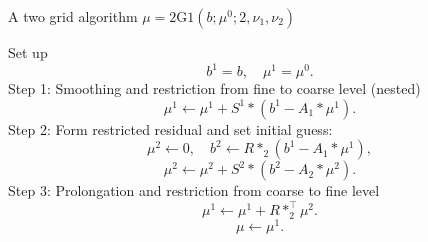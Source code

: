 \begin{breakablealgorithm}%
	\caption{A two grid algorithm $\mu = {\text{2G1}}(b; \mu^0; 2,\nu_1, \nu_2)$}
\label{alg:L-Slash11d}
\begin{algorithmic}
	\State Set up
		$$
		b^1 = b, \quad \mu^{1}=\mu^0. 
		$$
		\State Step 1: Smoothing and restriction from fine to coarse level (nested)
		\State
		\begin{equation}\label{eq:smoothing}
		\mu^{1} \leftarrow \mu^{1} + S^1 \ast (b^1 - A_1 \ast \mu^1).
		\end{equation}
		\EndFor
		\State Step 2: Form restricted residual and set initial guess:
		$$
		\mu^{2} \leftarrow 0, \quad b^{2} \leftarrow R \ast_2
                (b^1-  A_1\ast \mu^{1}), 
		$$
		\State
		\begin{equation}\label{eq:smoothing}
		\mu^2 \leftarrow \mu^2+ S^2 \ast (b^2- A_2\ast \mu^2).
		\end{equation}
		\EndFor
		\State Step 3: Prolongation and restriction from coarse to fine level
		\State
		$$
		\mu^{1} \leftarrow \mu^{1} + R  \ast_2^{\top} \mu^{2}.
		$$
		\State
		$$
		\mu \leftarrow \mu^{1}.
		$$
	\end{algorithmic}
\end{breakablealgorithm}





